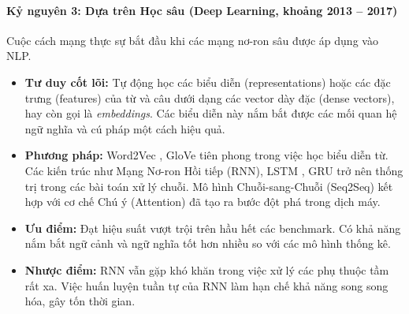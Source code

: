 \paragraph{Kỷ nguyên 3: Dựa trên Học sâu (Deep Learning, khoảng 2013 -- 2017)}
Cuộc cách mạng thực sự bắt đầu khi các mạng nơ-ron sâu được áp dụng vào NLP.
\begin{itemize}
    \item \textbf{Tư duy cốt lõi:} Tự động học các biểu diễn (representations) hoặc các đặc trưng (features) của từ và câu dưới dạng các vector dày đặc (dense vectors), hay còn gọi là \textit{embeddings}. Các biểu diễn này nắm bắt được các mối quan hệ ngữ nghĩa và cú pháp một cách hiệu quả.
    \item \textbf{Phương pháp:} Word2Vec \cite{mikolov2013efficient}, GloVe \cite{pennington2014glove} tiên phong trong việc học biểu diễn từ. Các kiến trúc như Mạng Nơ-ron Hồi tiếp (RNN), LSTM \cite{hochreiter1997long}, GRU \cite{cho2014learning} trở nên thống trị trong các bài toán xử lý chuỗi. Mô hình Chuỗi-sang-Chuỗi (Seq2Seq) \cite{sutskever2014sequence} kết hợp với cơ chế Chú ý (Attention) \cite{bahdanau2014neural} đã tạo ra bước đột phá trong dịch máy.
    \item \textbf{Ưu điểm:} Đạt hiệu suất vượt trội trên hầu hết các benchmark. Có khả năng nắm bắt ngữ cảnh và ngữ nghĩa tốt hơn nhiều so với các mô hình thống kê.
    \item \textbf{Nhược điểm:} RNN vẫn gặp khó khăn trong việc xử lý các phụ thuộc tầm rất xa. Việc huấn luyện tuần tự của RNN làm hạn chế khả năng song song hóa, gây tốn thời gian.
\end{itemize}

